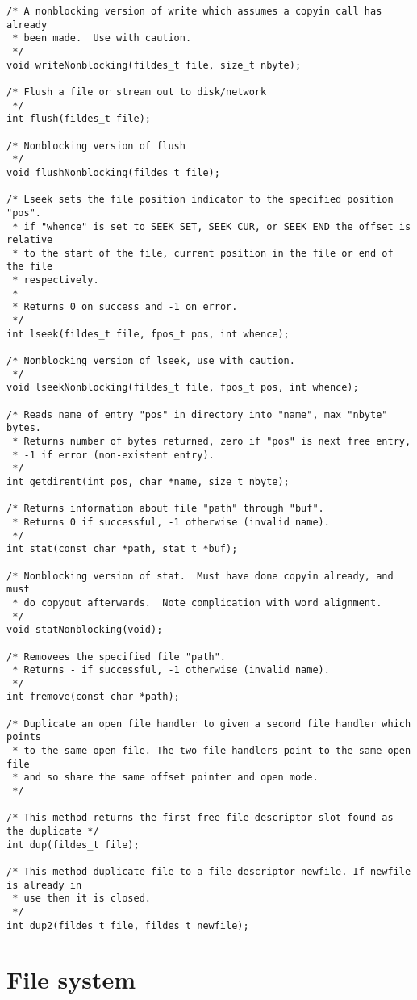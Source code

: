 \documentclass[12pt,english]{article}
\begin{document}
\begin{verbatim}
/* A nonblocking version of write which assumes a copyin call has already
 * been made.  Use with caution.
 */
void writeNonblocking(fildes_t file, size_t nbyte);

/* Flush a file or stream out to disk/network
 */
int flush(fildes_t file);

/* Nonblocking version of flush
 */
void flushNonblocking(fildes_t file);

/* Lseek sets the file position indicator to the specified position "pos".
 * if "whence" is set to SEEK_SET, SEEK_CUR, or SEEK_END the offset is relative
 * to the start of the file, current position in the file or end of the file
 * respectively.
 *
 * Returns 0 on success and -1 on error.
 */
int lseek(fildes_t file, fpos_t pos, int whence);

/* Nonblocking version of lseek, use with caution.
 */
void lseekNonblocking(fildes_t file, fpos_t pos, int whence); 

/* Reads name of entry "pos" in directory into "name", max "nbyte" bytes.
 * Returns number of bytes returned, zero if "pos" is next free entry,
 * -1 if error (non-existent entry).
 */
int getdirent(int pos, char *name, size_t nbyte);

/* Returns information about file "path" through "buf".
 * Returns 0 if successful, -1 otherwise (invalid name).
 */
int stat(const char *path, stat_t *buf);

/* Nonblocking version of stat.  Must have done copyin already, and must
 * do copyout afterwards.  Note complication with word alignment.
 */
void statNonblocking(void);

/* Removees the specified file "path".
 * Returns - if successful, -1 otherwise (invalid name).
 */
int fremove(const char *path);

/* Duplicate an open file handler to given a second file handler which points
 * to the same open file. The two file handlers point to the same open file
 * and so share the same offset pointer and open mode.
 */

/* This method returns the first free file descriptor slot found as the duplicate */
int dup(fildes_t file);

/* This method duplicate file to a file descriptor newfile. If newfile is already in
 * use then it is closed.
 */
int dup2(fildes_t file, fildes_t newfile);
\end{verbatim}



\section{File system} \label{vfs}
\end{document}
